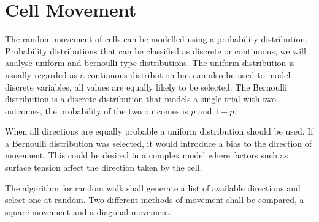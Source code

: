 \section{Cell Movement}


The random movement of cells can be modelled using a probability distribution.
Probability distributions that can be classified as discrete or continuous, we will analyse uniform and bernoulli type distributions.
The uniform distribution is usually regarded as a continuous distribution but can also be used to model discrete variables,
all values are equally likely to be selected.
The Bernoulli distribution is a discrete distribution that models a single trial with two outcomes,
the probability of the two outcomes is $p$ and $1-p$.







When all directions are equally probable a uniform distribution should be used.
If a Bernoulli distribution was selected, it would introduce a bias to the direction of movement.
This could be desired in a complex model where factors such as surface tension affect the direction taken by the cell.

The algorithm for random walk shall generate a list of available directions and select one at random.
Two different methods of movement shall be compared, a square movement and a diagonal movement.


